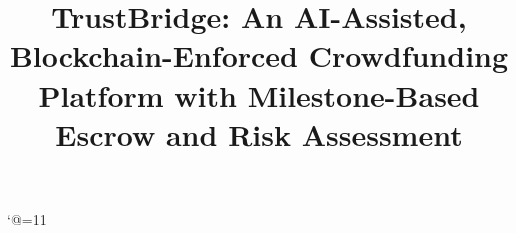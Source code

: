\bgroup
\catcode`@=11
\gdef\getfontsize{\f@size pt}
\egroup
\newcommand{\normal}{\fontsize{12pt}{16pt}\selectfont}
\newcommand{\size}{\fontsize{14pt}{18pt}\selectfont}
\newcommand{\bigsize}{\fontsize{16pt}{20pt}\selectfont}
\newcommand{\bigbigsize}{\fontsize{20pt}{24pt}\selectfont}
\title{\bigbigsize \textbf{TrustBridge: An AI-Assisted, Blockchain-Enforced Crowdfunding Platform with Milestone-Based Escrow and Risk Assessment}}

\thispagestyle{empty}
\maketitle
\restoregeometry
\newpage
